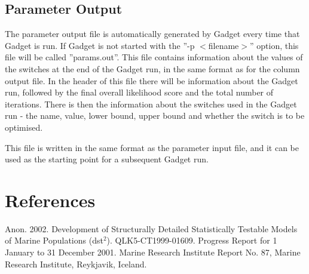 \documentclass[10pt,twoside]{book}
\begin{document}





\section{Parameter Output}\label{sec:paramoutput}
The parameter output file is automatically generated by Gadget every time that Gadget is run.  If Gadget is not started with the ''-p $<$filename$>$'' option, this file will be called ''params.out''.  This file contains information about the values of the switches at the end of the Gadget run, in the same format as for the column output file.  In the header of this file there will be information about the Gadget run, followed by the final overall likelihood score and the total number of iterations.  There is then the information about the switches used in the Gadget run - the name, value, lower bound, upper bound and whether the switch is to be optimised.

\bigskip
This file is written in the same format as the parameter input file, and it can be used as the starting point for a subsequent Gadget run.

\chapter{References}\label{chap:reference}
Anon. 2002. Development of Structurally Detailed Statistically Testable Models of Marine Populations (dst$^{2}$). QLK5-CT1999-01609. Progress Report for 1 January to 31 December 2001. Marine Research Institute Report No. 87, Marine Research Institute, Reykjavik, Iceland.\newline
\end{document}
